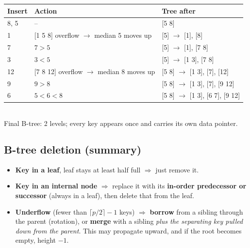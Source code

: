 \documentclass[10pt,a4paper]{article}
\newcommand{\sep}{\,$\mid$\,}
\begin{document}
\begin{exbox}[B-tree of order $p=3$ (max 2 keys/node): insert 8, 5, 1, 7, 3, 12, 9, 6]
\small
\begin{tabular}{@{}lll@{}}
\toprule
\textbf{Insert} & \textbf{Action} & \textbf{Tree after}\\\midrule
8, 5 & -- & [5 8]\\
1 & [1 5 8] overflow $\to$ median 5 moves up & [5] $\to$ [1], [8]\\
7 & $7>5$ & [5] $\to$ [1], [7 8]\\
3 & $3<5$ & [5] $\to$ [1 3], [7 8]\\
12 & [7 8 12] overflow $\to$ median 8 moves up & [5 8] $\to$ [1 3], [7], [12]\\
9 & $9>8$ & [5 8] $\to$ [1 3], [7], [9 12]\\
6 & $5<6<8$ & [5 8] $\to$ [1 3], [6 7], [9 12]\\
\bottomrule
\end{tabular}

\centering
{}\\
{\scriptsize Final B-tree: 2 levels; every key appears once and carries its own data pointer.}
\end{exbox}

\subsection{B-tree deletion (summary)}
\begin{itemize}
  \item \textbf{Key in a leaf}, leaf stays at least half full $\Rightarrow$ just remove it.
  \item \textbf{Key in an internal node} $\Rightarrow$ replace it with its \textbf{in-order predecessor or successor} (always in a leaf), then delete that from the leaf.
  \item \textbf{Underflow} (fewer than $\lceil p/2\rceil - 1$ keys) $\Rightarrow$ \textbf{borrow} from a sibling through the parent (rotation), or \textbf{merge} with a sibling \emph{plus the separating key pulled down from the parent}. This may propagate upward, and if the root becomes empty, height $-1$.
\end{itemize}
\end{document}
